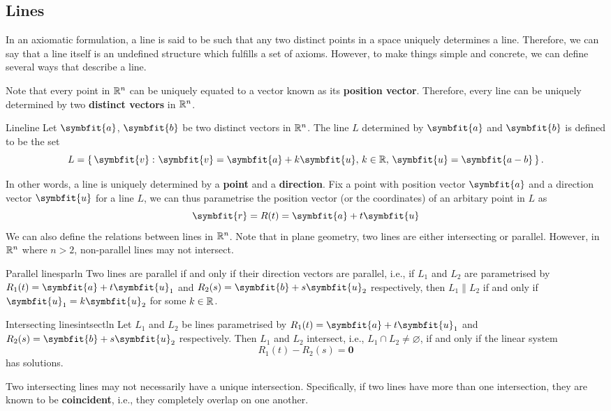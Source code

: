 \documentclass[math]{amznotes}
\theoremstyle{remark}
\begin{document}
\subsection{Lines}
In an axiomatic formulation, a line is said to be such that any two distinct points in a space uniquely determines a line. Therefore, we can say that a line itself is an undefined structure which fulfills a set of axioms. However, to make things simple and concrete, we can define several ways that describe a line.

Note that every point in $\mathbb{R}^n$ can be uniquely equated to a vector known as its {\color{red} \textbf{position vector}}. Therefore, every line can be uniquely determined by two {\color{red} \textbf{distinct vectors}} in $\mathbb{R}^n$.
\begin{dfnbox}{Line}{line}
    Let $\symbfit{a}$, $\symbfit{b}$ be two distinct vectors in $\mathbb{R}^n$. The line $L$ determined by $\symbfit{a}$ and $\symbfit{b}$ is defined to be the set
    \begin{displaymath}
        L = \left\{ \, \symbfit{v} \,\colon \symbfit{v} = \symbfit{a} + k \symbfit{u},\, k \in \R,\, \symbfit{u} = \symbfit{a - b} \, \right\}.
    \end{displaymath}
\end{dfnbox}
In other words, a line is uniquely determined by a {\color{red} \textbf{point}} and a {\color{red} \textbf{direction}}. Fix a point with position vector $\symbfit{a}$ and a direction vector $\symbfit{u}$ for a line $L$, we can thus parametrise the position vector (or the coordinates) of an arbitary point in $L$ as
\begin{equation*}
    \symbfit{r} = R(t) = \symbfit{a} + t \symbfit{u}
\end{equation*}
We can also define the relations between lines in $\mathbb{R}^n$. Note that in plane geometry, two lines are either intersecting or parallel. However, in $\mathbb{R}^n$ where $n > 2$, non-parallel lines may not intersect.
\begin{thmbox}{Parallel lines}{parln}
    Two lines are parallel if and only if their direction vectors are parallel, i.e., if $L_1$ and $L_2$ are parametrised by $R_1(t) = \symbfit{a} + t \symbfit{u}_1$ and $R_2(s) = \symbfit{b} + s \symbfit{u}_2$ respectively, then $L_1 \parallel L_2$ if and only if $\symbfit{u}_1 = k \symbfit{u}_2$ for some $k \in \mathbb{R}$.
\end{thmbox}
\begin{thmbox}{Intersecting lines}{intsectln}
    Let $L_1$ and $L_2$ be lines parametrised by $R_1(t) = \symbfit{a} + t \symbfit{u}_1$ and $R_2(s) = \symbfit{b} + s \symbfit{u}_2$ respectively. Then $L_1$ and $L_2$ intersect, i.e., $L_1 \cap L_2 \neq \varnothing$, if and only if the linear system
    \begin{displaymath}
        R_1(t) - R_2(s) = \symbf{0}
    \end{displaymath}
    has solutions.
\end{thmbox}
Two intersecting lines may not necessarily have a unique intersection. Specifically, if two lines have more than one intersection, they are known to be {\color{red} \textbf{coincident}}, i.e., they completely overlap on one another.
\end{document}
